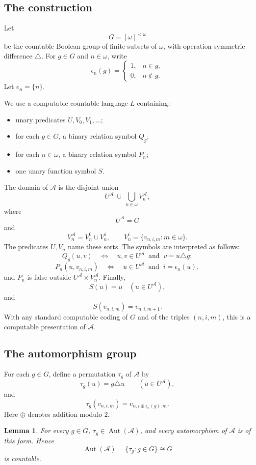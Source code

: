 \documentclass[12pt]{article}
\newtheorem{lemma}{Lemma}
\newcommand{\Aut}{\operatorname{Aut}}
\begin{document}
\subsection*{The construction}

Let
\[
G=[\omega]^{<\omega}
\]
be the countable Boolean group of finite subsets of $\omega$, with operation
symmetric difference $\triangle$.  For $g\in G$ and $n\in\omega$, write
\[
\epsilon_n(g)=
\begin{cases}
1,& n\in g,\\
0,& n\notin g.
\end{cases}
\]
Let $e_n=\{n\}$.

We use a computable countable language $L$ containing:
\begin{itemize}
\item unary predicates $U,V_0,V_1,\dots$;
\item for each $g\in G$, a binary relation symbol $Q_g$;
\item for each $n\in\omega$, a binary relation symbol $P_n$;
\item one unary function symbol $S$.
\end{itemize}

The domain of $\mathcal A$ is the disjoint union
\[
U^{\mathcal A}\ \cup\ \bigcup_{n\in\omega}V_n^{\mathcal A},
\]
where
\[
U^{\mathcal A}=G
\]
and
\[
V_n^{\mathcal A}=V_n^0\cup V_n^1,\qquad
V_n^i=\{v_{n,i,m}:m\in\omega\}.
\]
The predicates $U,V_n$ name these sorts.  The symbols are interpreted as follows:
\[
Q_g(u,v)\quad\Longleftrightarrow\quad u,v\in U^{\mathcal A}
\ \text{ and }\ v=u\triangle g;
\]
\[
P_n(u,v_{n,i,m})\quad\Longleftrightarrow\quad
u\in U^{\mathcal A}\ \text{ and }\ i=\epsilon_n(u),
\]
and $P_n$ is false outside $U^{\mathcal A}\times V_n^{\mathcal A}$.  Finally,
\[
S(u)=u\quad(u\in U^{\mathcal A}),
\]
and
\[
S(v_{n,i,m})=v_{n,i,m+1}.
\]
With any standard computable coding of $G$ and of the triples $(n,i,m)$, this is a computable presentation of $\mathcal A$.

\subsection*{The automorphism group}

For each $g\in G$, define a permutation $\tau_g$ of $\mathcal A$ by
\[
\tau_g(u)=g\triangle u\qquad(u\in U^{\mathcal A}),
\]
and
\[
\tau_g(v_{n,i,m})=v_{n,i\oplus \epsilon_n(g),m}.
\]
Here $\oplus$ denotes addition modulo $2$.

\begin{lemma}
For every $g\in G$, $\tau_g\in\Aut(\mathcal A)$, and every automorphism of
$\mathcal A$ is of this form.  Hence
\[
\Aut(\mathcal A)=\{\tau_g:g\in G\}\cong G
\]
is countable.
\end{lemma}
\end{document}

